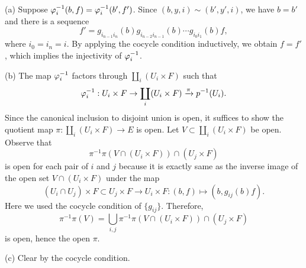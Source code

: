 \documentclass{../../large}
\begin{document}
\begin{pf}
(a)
Suppose $\varphi_i^{-1}(b,f)=\varphi_i^{-1}(b',f')$.
Since $(b,y,i)\sim(b',y',i)$, we have $b=b'$ and there is a sequence
\[f'=g_{i_{n-1}i_n}(b)g_{i_{n-2}i_{n-1}}(b)\cdots g_{i_0i_1}(b)f,\]
where $i_0=i_n=i$.
By applying the cocycle condition inductively, we obtain $f=f'$, which implies the injectivity of $\varphi_i^{-1}$.

(b)
The map $\varphi_i^{-1}$ factors through $\coprod_i(U_i\times F)$ such that
\[\varphi_i^{-1}:U_i\times F\to\coprod_i(U_i\times F)\xrightarrow{\pi}p^{-1}(U_i).\]
Since the canonical inclusion to disjoint union is open, it suffices to show the quotient map $\pi:\coprod_i(U_i\times F)\to E$ is open.
Let $V\subset\coprod_i(U_i\times F)$ be open.
Observe that
\[\pi^{-1}\pi(V\cap(U_i\times F))\cap(U_j\times F)\]
is open for each pair of $i$ and $j$ because it is exactly same as the inverse image of the open set $V\cap(U_i\times F)$ under the map
\[(U_i\cap U_j)\times F\subset U_j\times F\to U_i\times F:(b,f)\mapsto(b,g_{ij}(b)f).\]
Here we used the cocycle condition of $\{g_{ij}\}$.
Therefore,
\[\pi^{-1}\pi(V)=\bigcup_{i,j}\pi^{-1}\pi(V\cap(U_i\times F))\cap(U_j\times F)\]
is open, hence the open $\pi$.

(c)
Clear by the cocycle condition.
\end{pf}
\end{document}
